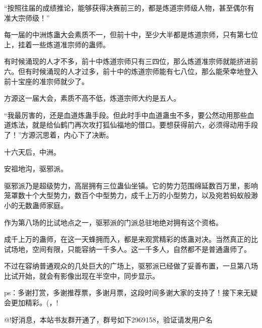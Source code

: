 \begin{this_body}
“按照往届的成绩推论，能够获得决赛前三的，都是炼道宗师级人物，甚至偶尔有准大宗师级！”

每一届的中洲炼蛊大会素质不一，但前十中，至少大半都是炼道宗师，只有第七位上，挂着一些炼道准宗师的蛊师。

有时候涌现的人才不多，前十中炼道宗师只有三四位，那么炼道准宗师就能挤进前六。但有时候涌现的人才过多，前十中的炼道宗师能有七八位，那么能荣幸地登入前十宝座的准宗师就少了。

方源这一届大会，素质不高不低，炼道宗师大约是五人。

“我最厉害的，还是血道炼蛊手段。但此时手中血道蛊虫不多，要公然动用那些血道炼法，就是给仙鹤门再次攻打狐仙福地的借口。要想获得前六，必须得动用手段了！”方源沉思着，内心下了决断。

十六天后，中洲。

安祖地沟，驱邪派。

驱邪派乃是超级势力，高层拥有三位蛊仙坐镇。它的势力范围绵延数百万里，影响笼罩数十个大型势力，数百个中型势力，成千上万的小型势力，以及宛若蚂蚁般渺小的无数蛊师家庭。

作为第八场的比试地点之一，驱邪派的门派总驻地绝对拥有这个资格。

成千上万的蛊师，在这一天蜂拥而入，都是来观赏精彩的炼蛊对决。当然真正的比试场地，空间有限，只能容纳一千多人。这一千多人，自然都不是普通蛊师了。

不过在容纳普通观众的几处巨大的广场上，驱邪派已经做了妥善布置，一旦第八场比试开始，就会有影像出现在半空中，同步显示。

ps：多谢打赏，多谢推荐票，多谢月票，这段时间多谢大家的支持了！接下来无疑会更加精彩。(，!

@!好消息，本站书友群开通了，群号如下2969158，验证请发用户名

\end{this_body}

